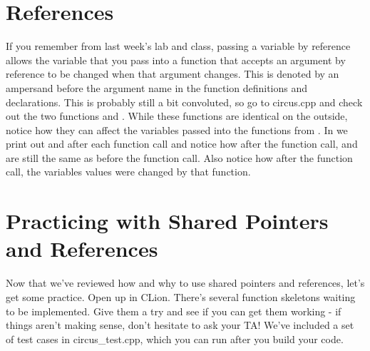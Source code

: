 \documentclass{tufte-handout}
\begin{document}
\section{References}
If you remember from last week's lab and class, passing a variable by reference allows the variable that you pass into a function that accepts an argument by reference to be changed when that argument changes.
This is denoted by an ampersand before the argument name in the function definitions and declarations.
This is probably still a bit convoluted, so go to circus.cpp and check out the two functions  and .  
While these functions are identical on the outside, notice how they can affect the variables passed into the functions from . 
In  we print out  and  after each function call and notice how after the  function call,  and  are still the same as before the function call.
Also notice how after the  function call, the variables values were changed by that function.

\section{Practicing with Shared Pointers and References}
Now that we've reviewed how and why to use shared pointers and references, let's get some practice. Open up  in CLion. 
There's several function skeletons waiting to be implemented. 
Give them a try and see if you can get them working - if things aren't making sense, don't hesitate to ask your TA!
We've included a set of test cases in circus\_test.cpp, which you can run after you build your code. 
\end{document}
